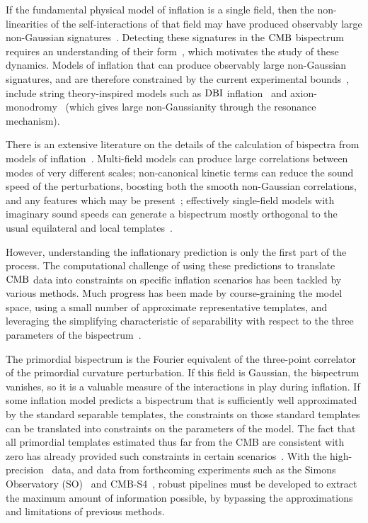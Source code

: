 If the fundamental physical model of inflation is a single field,
then the non-linearities of the self-interactions of that field may have
produced observably large non-Gaussian signatures~\cite{Tolley_2010, achucarro_eft}.
Detecting these signatures in the $\text{CMB}$ bispectrum requires an understanding
of their form~\cite{Komatsu_2005}, which motivates the study of these dynamics.
Models of inflation that can produce observably large non-Gaussian signatures,
and are therefore constrained by the current experimental bounds~\cite{Planck_NG_2018},
include string theory-inspired models such as $\text{DBI}$ inflation~\cite{dbi_silverstein}
and axion-monodromy~\cite{axion_monodr_review_09, Flauger_2014}
(which gives large non-Gaussianity through the resonance mechanism).


There is an extensive literature on the details of the calculation
of bispectra from models of inflation~\cite{chen_easther_lim_1,chen_easther_lim_2,chen_ng_0605,seery_ng_0503,px_burrage,adshead,flauger_pajer_resonant,features_bartolo,bdy_passaglia}.
Multi-field models can produce large
correlations between modes of very different scales;
non-canonical kinetic terms can reduce the sound speed of the perturbations,
boosting both the smooth non-Gaussian correlations, and any
features which may be present~\cite{dbi_adshead,dbi_in_the_sky,warp_features_dbi,dbi_silverstein,dbi_step_miranda,chen_folded_resonant,osc_avila};
effectively single-field models with imaginary sound speeds can generate a bispectrum
mostly orthogonal to the usual equilateral and local templates~\cite{RP_1}.


However, understanding the inflationary prediction is only the first part of the process.
The computational challenge of using these predictions to translate
$\text{CMB}$ data into constraints on specific inflation scenarios has been tackled by
various methods.
Much progress has been made by course-graining
the model space, using a small number of approximate representative templates,
and leveraging the simplifying characteristic of separability
with respect to the three parameters of the bispectrum~\cite{Komatsu_2005, Munchmeyer_2014}.


The primordial bispectrum is the Fourier equivalent of the
three-point correlator of the primordial curvature perturbation.
If this field is Gaussian, the bispectrum vanishes, so
it is a valuable measure of the interactions in play during inflation.
If some inflation model predicts a bispectrum that is sufficiently well approximated by
the standard separable templates, the constraints on those standard templates
can be translated into constraints on the parameters of the model.
The fact that all primordial templates estimated thus far from the CMB
are consistent with zero has already provided such constraints
in certain scenarios~\cite{Planck_NG_2015, Planck_NG_2018}.
With the high-precision \planck~data, and data from forthcoming experiments
such as the Simons Observatory (SO)~\cite{simons}
and CMB-S4~\cite{abazajian2016cmbs4}, robust pipelines must be developed to
extract the maximum amount of information possible,
by bypassing the approximations and
limitations of previous methods.


